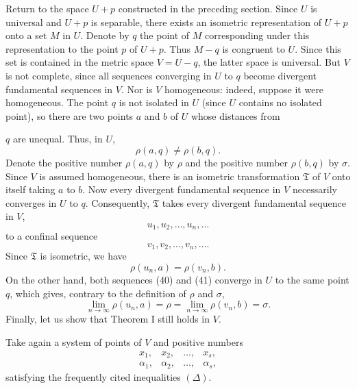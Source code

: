 \documentclass[a4paper,12pt]{amsart}
\newcommand{\srcpage}[1]{} %
\begin{document}
Return to the space $U+p$ constructed in the preceding section. Since $U$ is universal and $U+p$ is separable, there exists an isometric representation of $U+p$ onto a set $M$ in $U$. Denote by $q$ the point of $M$ corresponding under this representation to the point $p$ of $U+p$. Thus $M-q$ is congruent to $U$. Since this set is contained in the metric space $V=U-q$, the latter space is universal. But $V$ is not complete, since all sequences converging in $U$ to $q$ become divergent fundamental sequences in $V$. Nor is $V$ homogeneous: indeed, suppose it were homogeneous. The point $q$ is not isolated in $U$ (since $U$ contains no isolated point), so there are two points $a$ and $b$ of $U$ whose distances from
\srcpage{80}
$q$ are unequal. Thus, in $U$,
\[
\rho(a,q)\ne\rho(b,q).
\]
Denote the positive number $\rho(a,q)$ by $\rho$ and the positive number $\rho(b,q)$ by $\sigma$. Since $V$ is assumed homogeneous, there is an isometric transformation $\mathfrak{T}$ of $V$ onto itself taking $a$ to $b$. Now every divergent fundamental sequence in $V$ necessarily converges in $U$ to $q$. Consequently, $\mathfrak{T}$ takes every divergent fundamental sequence in $V$,
\begin{equation}\tag{40}
u_1,u_2,\dots,u_n,\dots
\end{equation}
to a confinal sequence
\begin{equation}\tag{41}
v_1,v_2,\dots,v_n,\dots.
\end{equation}
Since $\mathfrak{T}$ is isometric, we have
\begin{equation}\tag{41}
\rho(u_n,a)=\rho(v_n,b).
\end{equation}
On the other hand, both sequences (40) and (41) converge in $U$ to the same point $q$, which gives, contrary to the definition of $\rho$ and $\sigma$,
\begin{equation}\tag{42}
\lim_{n\to\infty}\rho(u_n,a)=\rho=\lim_{n\to\infty}\rho(v_n,b)=\sigma.
\end{equation}
Finally, let us show that Theorem I still holds in $V$.

Take again a system of points of $V$ and positive numbers
\[
\begin{array}{cccc}
x_1,&x_2,&\dots,&x_s,\\
\alpha_1,&\alpha_2,&\dots,&\alpha_s,
\end{array}
\]
satisfying the frequently cited inequalities $(\Delta)$.
\end{document}
